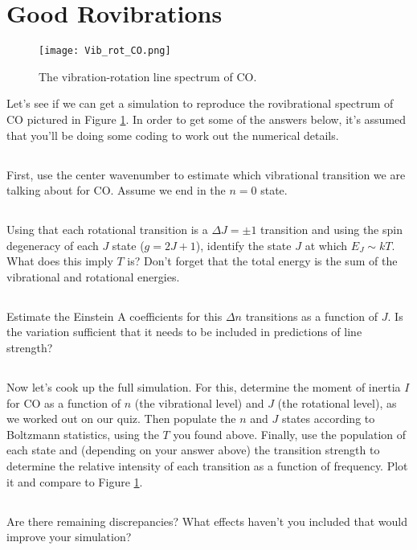 \documentclass[11pt]{article}
\begin{document}
\section{Good Rovibrations}
\vspace{-8pt}

\begin{figure}
\texttt{[image: Vib\_rot\_CO.png]}
\caption{The vibration-rotation line spectrum of CO.}
\label{fig:co}
\end{figure}

Let's see if we can get a simulation to reproduce the rovibrational spectrum of CO pictured in
Figure \ref{fig:co}.
In order to get some of the answers below, it's assumed that you'll be doing some coding to work out
the numerical details.

\subsection{}
\vspace{-8pt}
First, use the center wavenumber to estimate which vibrational transition we are talking about for CO.
Assume we end in the $n=0$ state.

\subsection{}
\vspace{-8pt}
Using that each rotational transition is a $\Delta J=\pm1$ transition and using the spin degeneracy
of each $J$ state ($g=2J+1$), identify the state $J$ at which $E_J\sim kT$.  What does this imply $T$ is?
Don't forget that the total energy is the sum of the vibrational and rotational energies.

\subsection{}
\vspace{-8pt}
Estimate the Einstein A coefficients for this $\Delta n$ transitions as a function of $J$.  Is the
variation sufficient that it needs to be included in predictions of line strength?

\subsection{}
\vspace{-8pt}
Now let's cook up the full simulation.  For this, determine the moment of inertia $I$ for CO as
a function of $n$ (the vibrational level) and $J$ (the rotational level), as we worked out on our
quiz.  Then populate the $n$ and $J$ states according to Boltzmann statistics, using the $T$ you found above.
Finally, use the population of each state and (depending on your answer above) the transition strength
to determine the relative intensity of each transition as a function of frequency.  Plot it and compare to
Figure \ref{fig:co}.

\subsection{}
Are there remaining discrepancies?  What effects haven't you included that would improve your simulation?
\end{document}
